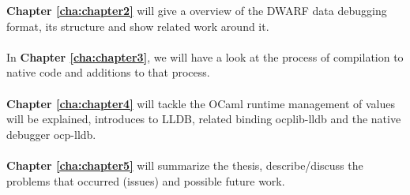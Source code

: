 \textbf{Chapter \ref{cha:chapter2}} will give a overview of the DWARF
data debugging format, its structure and show related work around it.
\\
\\
In \textbf{Chapter \ref{cha:chapter3}}, we will have a look at the process of
compilation to native code and additions to that process.
\\
\\
\textbf{Chapter \ref{cha:chapter4}} will tackle the OCaml runtime management of
values will be explained, introduces to LLDB, related binding ocplib-lldb and
the native debugger ocp-lldb.
\\
\\
\textbf{Chapter \ref{cha:chapter5}} will summarize the thesis,
describe/discuss the problems that occurred (issues) and possible future work.


